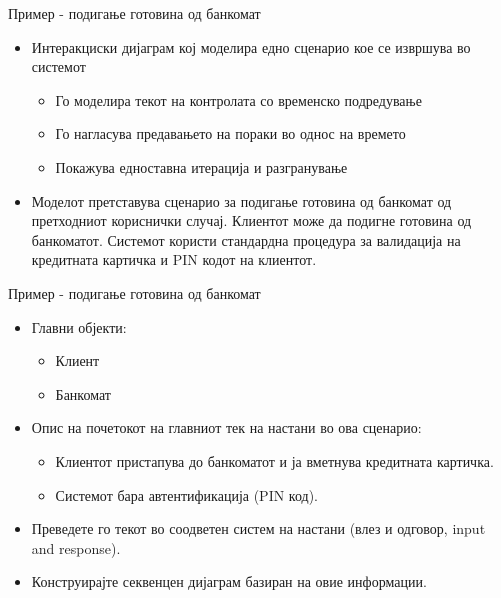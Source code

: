 \begin{frame}{Пример - подигање готовина од банкомат}
\begin{itemize}
  \item Интеракциски дијаграм кој моделира едно сценарио кое се извршува во системот
\begin{itemize}
  \item Го моделира текот на контролата со временско подредување
  \item Го нагласува предавањето на пораки во однос на времето
  \item Покажува едноставна итерација и разгранување 
\end{itemize}
\item Моделот претставува сценарио за подигање готовина од банкомат од
претходниот кориснички случај. Клиентот може да подигне готовина од банкоматот. 
Системот користи стандардна процедура за валидација на кредитната картичка и PIN кодот на клиентот.
\end{itemize}
\end{frame}
    
\begin{frame}{Пример - подигање готовина од банкомат}
\begin{itemize}
  \item Главни објекти:
\begin{itemize}
  \item Клиент
  \item Банкомат
  \end{itemize}
  \item Опис на почетокот на главниот тек на настани во ова сценарио:
  \begin{itemize}
  \item Клиентот пристапува до банкоматот и ја вметнува кредитната картичка.
  \item Системот бара автентификација (PIN код).
\end{itemize}
  \item Преведете го текот во соодветен систем на настани (влез и одговор, input and response).
  \item Конструирајте секвенцен дијаграм базиран на овие информации.
\end{itemize}
\end{frame}


